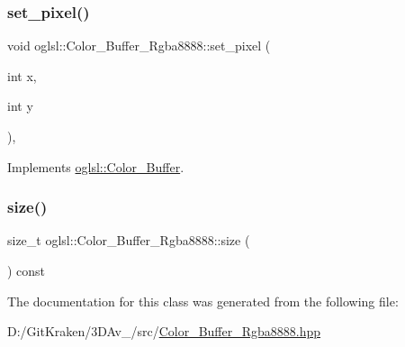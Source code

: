 \subsubsection{\texorpdfstring{set\+\_\+pixel()}{set\_pixel()}\hspace{0.1cm}{\footnotesize\ttfamily [2/2]}}
{\footnotesize\ttfamily void oglsl\+::\+Color\+\_\+\+Buffer\+\_\+\+Rgba8888\+::set\+\_\+pixel (\begin{DoxyParamCaption}\item[{int}]{x,  }\item[{int}]{y }\end{DoxyParamCaption})\hspace{0.3cm}{\ttfamily [inline]}, {\ttfamily [virtual]}}



Implements \mbox{\hyperlink{classoglsl_1_1_color___buffer_a45662e4f8c5d9776eb125d1c605d36d8}{oglsl\+::\+Color\+\_\+\+Buffer}}.

\mbox{\label{classoglsl_1_1_color___buffer___rgba8888_a6017d41ebb2a8d35c68e5e2c9efb4c3c}} 
\subsubsection{\texorpdfstring{size()}{size()}}
{\footnotesize\ttfamily size\+\_\+t oglsl\+::\+Color\+\_\+\+Buffer\+\_\+\+Rgba8888\+::size (\begin{DoxyParamCaption}{ }\end{DoxyParamCaption}) const\hspace{0.3cm}{\ttfamily [inline]}}



The documentation for this class was generated from the following file\+:\begin{DoxyCompactItemize}
\item 
D\+:/\+Git\+Kraken/3\+D\+Av\+\_/src/\mbox{\hyperlink{_color___buffer___rgba8888_8hpp}{Color\+\_\+\+Buffer\+\_\+\+Rgba8888.\+hpp}}\end{DoxyCompactItemize}
